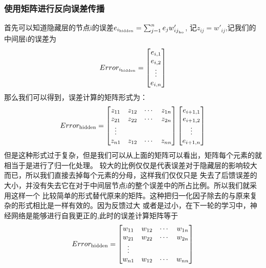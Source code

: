 \documentclass[12pt]{article}
\begin{document}
    \subsubsection{使用矩阵进行反向误差传播}
    首先可以知道隐藏层的节点i的误差$e_{{i}_{\rm hidden}}=\sum_{j=1}^{n}{e_jw'_{{ij}_{\rm ho}}}$,
    记$z_{ij}=w'_{ij}$,记我们的中间层i的误差为
    \begin{equation}
        Error_{{i}_{\rm hidden}}
        =
        \begin{bmatrix}
            e_{i,1}\\
            e_{i,2}\\
            \vdots\\
            e_{i,n}
        \end{bmatrix} 
    \end{equation}
    那么我们可以得到，误差计算的矩阵形式为：
    \begin{equation}
        Error_{\rm hidden}=
        \begin{bmatrix}
            z_{11} & z_{12} & \cdots & z_{1n}\\
            z_{21} & z_{22} & \cdots & z_{2n}\\
            \vdots\\
            z_{n1} & z_{12} & \cdots & z_{nn}\\
        \end{bmatrix}
        \begin{bmatrix}
            e_{i+1,1}\\
            e_{i+1,2}\\
            \vdots\\
            e_{i+1,n}
        \end{bmatrix}
    \end{equation}
    但是这种形式过于复杂，但是我们可以从上面的矩阵可以看出，矩阵每个元素的就相当于是进行了归一化处理。
    较大的比例仅仅是代表误差对于隐藏层的影响较大而已，所以我们直接去掉每个元素的分母，这样我们仅仅只是
    失去了后馈误差的大小，并没有失去它在对于中间层节点i的整个误差中的所占比例。所以我们就采用这样一个
    比较简单的形式替代原来的矩阵。这种把归一化因子除去的与原来复杂的形式相比是一样有效的。因为反馈过大
    或者是过小，在下一轮的学习中，神经网络是能够进行自我更正的,此时的误差计算矩阵等于
    \begin{equation}
        Error_{\rm hidden} =
        \begin{bmatrix}
            w_{11} & w_{12} & \cdots & w_{1n}\\
            w_{21} & w_{22} & \cdots & w_{2n}\\
            \vdots\\
            w_{n1} & w_{12} & \cdots & w_{nn}\\
        \end{bmatrix}
    \end{equation}
\end{document}
